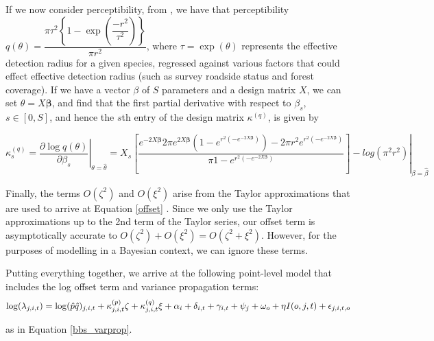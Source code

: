 \documentclass[12pt]{article}
\begin{document}
\par If we now consider perceptibility, from \citet{solymos_calibrating_2013}, we have that perceptibility $q(\theta) = \dfrac{\pi \tau^2 \left\{1 - \exp\left(\dfrac{-r^2}{\tau^2}\right)\right\}}{\pi r^2}$, where $\tau = \exp(\theta)$ represents the effective detection radius for a given species, regressed against various factors that could effect effective detection radius (such as survey roadside status and forest coverage). 
If we have a vector {\boldmath$\beta$} of $S$ parameters and a design matrix $X$, we can set $\theta = X\boldsymbol{\beta}$, and find that the first partial derivative with respect to $\beta_s$, $s \in \left[0, S\right]$, and hence the $s$th entry of the design matrix $\kappa^{(q)}$, is given by

\begin{equation*}\label{kappa_q}
	\kappa_{s}^{(q)} = \left. \dfrac{\partial \log q(\theta)}{\partial \beta_s} \right\vert_{\theta = \hat{\theta}}= \left. X_s \left[\dfrac{{e^{-2X\boldsymbol{\beta}}} {2 \pi  e^{2X\boldsymbol{\beta}}} {\left(1 - e^{r^2 \left(-e^{-2X\boldsymbol{\beta}}\right)}\right)} - {2\pi r^2} {e^{r^2 \left(-e^{-2X\boldsymbol{\beta}}\right)}}}             {\pi {1-e^{r^2 \left(-e^{-2X\boldsymbol{\beta}}\right)}}}\right]  - log(\pi^2r^2) \right\vert_{\beta = \hat{\beta}}
\end{equation*}

\par Finally, the terms $O(\zeta^2)$ and $O(\xi^2)$ arise from the Taylor approximations that are used to arrive at Equation \ref{offset} \citep{bravington_variance_2021}. 
Since we only use the Taylor approximations up to the 2nd term of the Taylor series, our offset term is asymptotically accurate to $O(\zeta^2) + O(\xi^2) = O(\zeta^2 + \xi^2)$.
However, for the purposes of modelling in a Bayesian context, we can ignore these terms.

Putting everything together, we arrive at the following point-level model that includes the log offset term and variance propagation terms:
\begin{equation*}
	\log(\lambda_{j,i,t}) = \log(\hat{p} \hat{q})_{j,i,t} + \kappa_{j,i,t}^{(p)}\zeta + \kappa_{j,i,t}^{(q)}\xi + \alpha_i + \delta_{i,t} + \gamma_{i,t} + \psi_j + \omega_o + \eta I(o,j,t) + \epsilon_{j,i,t,o} \\
\end{equation*}

as in Equation \ref{bbs_varprop}.
\end{document}
